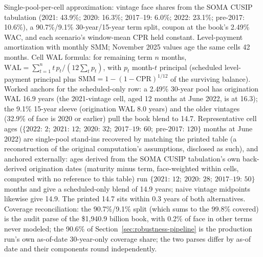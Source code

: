 \documentclass[12pt]{article}
\begin{document}
\begin{table}[H]
\begin{threeparttable}
\begin{tablenotes}[flushleft]
\item Single-pool-per-cell approximation: vintage face shares from the SOMA CUSIP tabulation (2021: 43.9\%; 2020: 16.3\%; 2017--19: 6.0\%; 2022: 23.1\%; pre-2017: 10.6\%), a 90.7\%/9.1\% 30-year/15-year term split, coupon at the book's 2.49\% WAC, and each scenario's window-mean CPR held constant. Level-payment amortization with monthly SMM; November 2025 values age the same cells 42 months. Cell WAL formula: for remaining term $n$ months, $\mathrm{WAL} = \sum_{t=1}^{n} t\, p_t / (12 \sum_{t} p_t)$, with $p_t$ month-$t$ principal (scheduled level-payment principal plus $\mathrm{SMM} = 1-(1-\mathrm{CPR})^{1/12}$ of the surviving balance). Worked anchors for the scheduled-only row: a 2.49\% 30-year pool has origination WAL 16.9 years (the 2021-vintage cell, aged 12 months at June 2022, is at 16.3); the 9.1\% 15-year sleeve (origination WAL 8.0 years) and the older vintages (32.9\% of face is 2020 or earlier) pull the book blend to 14.7. Representative cell ages ($\{2022{:}\,2;\ 2021{:}\,12;\ 2020{:}\,32;\ 2017\text{--}19{:}\,60;\ \text{pre-}2017{:}\,120\}$ months at June 2022) are single-pool stand-ins recovered by matching the printed table (a reconstruction of the original computation's assumptions, disclosed as such), and anchored externally: ages derived from the SOMA CUSIP tabulation's own back-derived origination dates (maturity minus term, face-weighted within cells, computed with no reference to this table) run $\{2021{:}\,12;\ 2020{:}\,28;\ 2017\text{--}19{:}\,50\}$ months and give a scheduled-only blend of 14.9 years; naive vintage midpoints likewise give 14.9. The printed 14.7 sits within 0.3 years of both alternatives. Coverage reconciliation: the 90.7\%/9.1\% split (which sums to the 99.8\% covered) is the audit parse of the \$1{,}940.9 billion book, with 0.2\% of face in other terms never modeled; the 90.6\% of Section~\ref{sec:robustness-pipeline} is the production run's own as-of-date 30-year-only coverage share; the two parses differ by as-of date and their components round independently.
\end{tablenotes}
\end{threeparttable}
\end{table}
\end{document}
